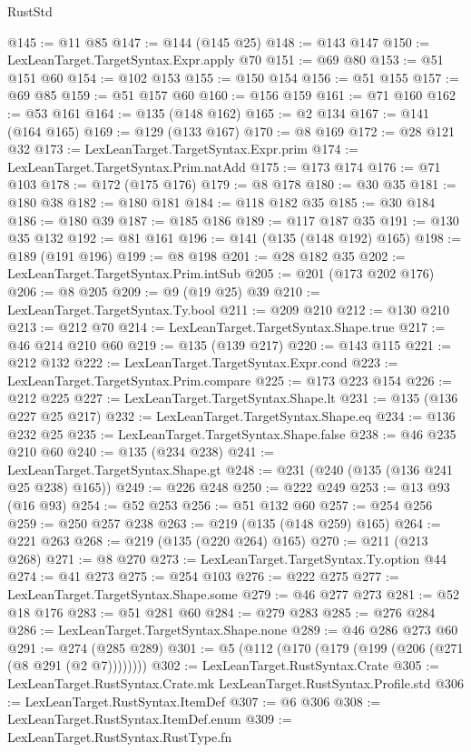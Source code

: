 \begin{lexlean}{RustStd}
\begin{coremodule}
@145 := @11 @85
@147 := @144 (@145 @25)
@148 := @143 @147
@150 := LexLeanTarget.TargetSyntax.Expr.apply @70
@151 := @69 @80
@153 := @51 @151 @60
@154 := @102 @153
@155 := @150 @154
@156 := @51 @155
@157 := @69 @85
@159 := @51 @157 @60
@160 := @156 @159
@161 := @71 @160
@162 := @53 @161
@164 := @135 (@148 @162)
@165 := @2 @134
@167 := @141 (@164 @165)
@169 := @129 (@133 @167)
@170 := @8 @169
@172 := @28 @121 @32
@173 := LexLeanTarget.TargetSyntax.Expr.prim
@174 := LexLeanTarget.TargetSyntax.Prim.natAdd
@175 := @173 @174
@176 := @71 @103
@178 := @172 (@175 @176)
@179 := @8 @178
@180 := @30 @35
@181 := @180 @38
@182 := @180 @181
@184 := @118 @182 @35
@185 := @30 @184
@186 := @180 @39
@187 := @185 @186
@189 := @117 @187 @35
@191 := @130 @35 @132
@192 := @81 @161
@196 := @141 (@135 (@148 @192) @165)
@198 := @189 (@191 @196)
@199 := @8 @198
@201 := @28 @182 @35
@202 := LexLeanTarget.TargetSyntax.Prim.intSub
@205 := @201 (@173 @202 @176)
@206 := @8 @205
@209 := @9 (@19 @25) @39
@210 := LexLeanTarget.TargetSyntax.Ty.bool
@211 := @209 @210
@212 := @130 @210
@213 := @212 @70
@214 := LexLeanTarget.TargetSyntax.Shape.true
@217 := @46 @214 @210 @60
@219 := @135 (@139 @217)
@220 := @143 @115
@221 := @212 @132
@222 := LexLeanTarget.TargetSyntax.Expr.cond
@223 := LexLeanTarget.TargetSyntax.Prim.compare
@225 := @173 @223 @154
@226 := @212 @225
@227 := LexLeanTarget.TargetSyntax.Shape.lt
@231 := @135 (@136 @227 @25 @217)
@232 := LexLeanTarget.TargetSyntax.Shape.eq
@234 := @136 @232 @25
@235 := LexLeanTarget.TargetSyntax.Shape.false
@238 := @46 @235 @210 @60
@240 := @135 (@234 @238)
@241 := LexLeanTarget.TargetSyntax.Shape.gt
@248 := @231 (@240 (@135 (@136 @241 @25 @238) @165))
@249 := @226 @248
@250 := @222 @249
@253 := @13 @93 (@16 @93)
@254 := @52 @253
@256 := @51 @132 @60
@257 := @254 @256
@259 := @250 @257 @238
@263 := @219 (@135 (@148 @259) @165)
@264 := @221 @263
@268 := @219 (@135 (@220 @264) @165)
@270 := @211 (@213 @268)
@271 := @8 @270
@273 := LexLeanTarget.TargetSyntax.Ty.option @44
@274 := @41 @273
@275 := @254 @103
@276 := @222 @275
@277 := LexLeanTarget.TargetSyntax.Shape.some
@279 := @46 @277 @273
@281 := @52 @18 @176
@283 := @51 @281 @60
@284 := @279 @283
@285 := @276 @284
@286 := LexLeanTarget.TargetSyntax.Shape.none
@289 := @46 @286 @273 @60
@291 := @274 (@285 @289)
@301 := @5 (@112 (@170 (@179 (@199 (@206 (@271 (@8 @291 (@2 @7))))))))
@302 := LexLeanTarget.RustSyntax.Crate
@305 := LexLeanTarget.RustSyntax.Crate.mk LexLeanTarget.RustSyntax.Profile.std
@306 := LexLeanTarget.RustSyntax.ItemDef
@307 := @6 @306
@308 := LexLeanTarget.RustSyntax.ItemDef.enum
@309 := LexLeanTarget.RustSyntax.RustType.fn

\end{coremodule}
\end{lexlean}
